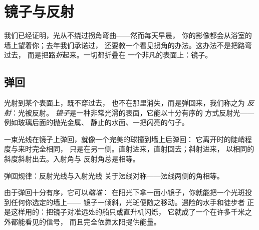\chapter{镜子与反射}\label{ch:g5:mirrors-reflection}

我们已经证明，光从不绕过拐角弯曲——然而每天早晨，
你的影像都会从浴室的墙上望着你；去年我们承诺过，
还要教一个看见拐角的办法。这办法不是把路弯过去，
而是把路\emph{折}起来。一切都折叠在
一个非凡的表面上：镜子。

\section{弹回}

\begin{definition}[反射]\label{def:g5:mirrors-reflection:reflection}
光射到某个表面上，既不穿过去，
也不在那里消失，而是弹回来，我们称之为
\emph{反射}：光被反射。
\emph{镜子}是一种非常光滑的表面，它能以十分有序的
方式反射光——例如玻璃后面的抛光金属、
静止的水面、一把闪亮的勺子。
\end{definition}

\begin{proposition}[弹回规律]\label{prop:g5:mirrors-reflection:bounce}
一束光线在镜子上弹回，就像一个完美的球撞到墙上后弹回：
它离开时的陡峭程度与来时完全相同，
只是在另一侧。直射进来，直射回去；斜射进来，
以相同的斜度斜射出去。入射角与
反射角总是相等。
\end{proposition}

\begin{omfigure}

{\small 弹回规律：反射光线与入射光线
关于法线对称——法线两侧的角相等。}
\end{omfigure}

\begin{example}[瞄准弹回的光]\label{ex:g5:mirrors-reflection:aiming}
由于弹回十分有序，它可以\emph{瞄准}：
在阳光下拿一面小镜子，你就能把一个光斑投到任何你选定的墙上——
镜子一倾斜，光斑便随之移动。遇险的水手和徒步者
正是这样用的：把镜子对准远处的船只或直升机闪烁，
它就成了一个在许多千米之外都能看见的信号，
而且完全依靠太阳提供能量。
\end{example}

